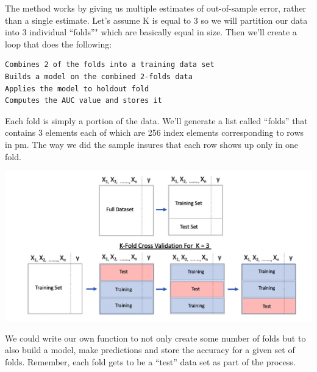 \documentclass[
]{article}
\begin{document}
The method works by giving us multiple estimates of out-of-sample error,
rather than a single estimate. Let's assume K is equal to 3 so we will
partition our data into 3 individual ``folds''" which are basically
equal in size. Then we'll create a loop that does the following:

\begin{verbatim}
Combines 2 of the folds into a training data set
Builds a model on the combined 2-folds data
Applies the model to holdout fold
Computes the AUC value and stores it
\end{verbatim}

Each fold is simply a portion of the data. We'll generate a list called
``folds'' that contains 3 elements each of which are 256 index elements
corresponding to rows in pm. The way we did the sample insures that each
row shows up only in one fold.

\includegraphics[width=1.2\textwidth,height=\textheight]{./IMG/crossfold.png}

We could write our own function to not only create some number of folds
but to also build a model, make predictions and store the accuracy for a
given set of folds. Remember, each fold gets to be a ``test'' data set
as part of the process.
\end{document}
